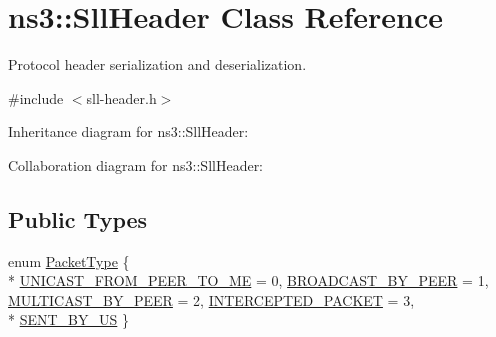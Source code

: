 \hypertarget{classns3_1_1SllHeader}{}\section{ns3\+:\+:Sll\+Header Class Reference}
\label{classns3_1_1SllHeader}


Protocol header serialization and deserialization.  




{\ttfamily \#include $<$sll-\/header.\+h$>$}



Inheritance diagram for ns3\+:\+:Sll\+Header\+:


Collaboration diagram for ns3\+:\+:Sll\+Header\+:
\subsection*{Public Types}
\begin{DoxyCompactItemize}
\item 
enum \hyperlink{classns3_1_1SllHeader_a82af509915aa0f97f81f806f2286937c}{Packet\+Type} \{ \\*
\hyperlink{classns3_1_1SllHeader_a82af509915aa0f97f81f806f2286937caa3caa3c999322df4617a1484ef00a8d7}{U\+N\+I\+C\+A\+S\+T\+\_\+\+F\+R\+O\+M\+\_\+\+P\+E\+E\+R\+\_\+\+T\+O\+\_\+\+ME} = 0, 
\hyperlink{classns3_1_1SllHeader_a82af509915aa0f97f81f806f2286937ca87116a39438e84207fe035c61c3b90df}{B\+R\+O\+A\+D\+C\+A\+S\+T\+\_\+\+B\+Y\+\_\+\+P\+E\+ER} = 1, 
\hyperlink{classns3_1_1SllHeader_a82af509915aa0f97f81f806f2286937cabb5f41d807a89b484016b88123a65d46}{M\+U\+L\+T\+I\+C\+A\+S\+T\+\_\+\+B\+Y\+\_\+\+P\+E\+ER} = 2, 
\hyperlink{classns3_1_1SllHeader_a82af509915aa0f97f81f806f2286937ca9d8730e73bf028ff4624def14f25a79c}{I\+N\+T\+E\+R\+C\+E\+P\+T\+E\+D\+\_\+\+P\+A\+C\+K\+ET} = 3, 
\\*
\hyperlink{classns3_1_1SllHeader_a82af509915aa0f97f81f806f2286937cac5c9105ba03bf4ee4dd34828f8dbbbd2}{S\+E\+N\+T\+\_\+\+B\+Y\+\_\+\+US}
 \}
\end{DoxyCompactItemize}
